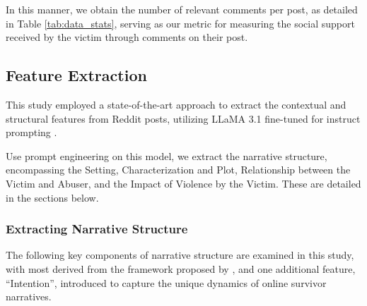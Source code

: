 \documentclass[11pt]{article}
\begin{document}
In this manner, we obtain the number of relevant comments per post, as detailed in Table \ref{tab:data_stats}, serving as our metric for measuring the social support received by the victim through comments on their post.

\subsection{Feature Extraction} 
This study employed a state-of-the-art approach to extract the contextual and structural features from Reddit posts, utilizing LLaMA 3.1 fine-tuned for instruct prompting \citep{dubey2024llama}. 

Use prompt engineering on this model, we extract the narrative structure, encompassing the Setting, Characterization and Plot, Relationship between the Victim and Abuser, and the Impact of Violence by the Victim. These are detailed in the sections below. 

\subsubsection{Extracting Narrative Structure}

The following key components of narrative structure are examined in this study, with most derived from the framework proposed by \citep{neimeyer2001coping}, and one additional feature, ``Intention'', introduced to capture the unique dynamics of online survivor narratives.
\end{document}
